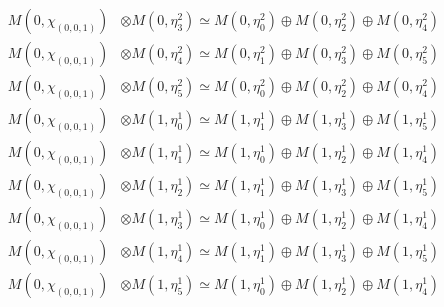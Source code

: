 \begin{align*}
M(0,\chi_{(0,0,1)}) &\otimes M(0,\eta^{2}_{3}) \simeq M(0,\eta^{2}_{0}) \oplus M(0,\eta^{2}_{2}) \oplus M(0,\eta^{2}_{4}) \\
M(0,\chi_{(0,0,1)}) &\otimes M(0,\eta^{2}_{4}) \simeq M(0,\eta^{2}_{1}) \oplus M(0,\eta^{2}_{3}) \oplus M(0,\eta^{2}_{5}) \\
M(0,\chi_{(0,0,1)}) &\otimes M(0,\eta^{2}_{5}) \simeq M(0,\eta^{2}_{0}) \oplus M(0,\eta^{2}_{2}) \oplus M(0,\eta^{2}_{4}) \\
M(0,\chi_{(0,0,1)}) &\otimes M(1,\eta^{1}_{0}) \simeq M(1,\eta^{1}_{1}) \oplus M(1,\eta^{1}_{3}) \oplus M(1,\eta^{1}_{5}) \\
M(0,\chi_{(0,0,1)}) &\otimes M(1,\eta^{1}_{1}) \simeq M(1,\eta^{1}_{0}) \oplus M(1,\eta^{1}_{2}) \oplus M(1,\eta^{1}_{4}) \\
M(0,\chi_{(0,0,1)}) &\otimes M(1,\eta^{1}_{2}) \simeq M(1,\eta^{1}_{1}) \oplus M(1,\eta^{1}_{3}) \oplus M(1,\eta^{1}_{5}) \\
M(0,\chi_{(0,0,1)}) &\otimes M(1,\eta^{1}_{3}) \simeq M(1,\eta^{1}_{0}) \oplus M(1,\eta^{1}_{2}) \oplus M(1,\eta^{1}_{4}) \\
M(0,\chi_{(0,0,1)}) &\otimes M(1,\eta^{1}_{4}) \simeq M(1,\eta^{1}_{1}) \oplus M(1,\eta^{1}_{3}) \oplus M(1,\eta^{1}_{5}) \\
M(0,\chi_{(0,0,1)}) &\otimes M(1,\eta^{1}_{5}) \simeq M(1,\eta^{1}_{0}) \oplus M(1,\eta^{1}_{2}) \oplus M(1,\eta^{1}_{4}) \\
\end{align*}

